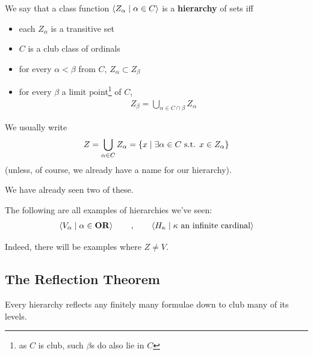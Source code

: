 \begin{boxdefinition}[Hierarchy] \label{Ch3:Def:Hierarchy}
    We say that a class function $\left\langle Z_{\alpha} \; \middle| \; \alpha \in C \right\rangle$ is a \textbf{hierarchy} of sets iff
    \begin{itemize}
        \item each $Z_{\alpha}$ is a transitive set
        \item $C$ is a club class of ordinals
        \item for every $\alpha < \beta$ from $C$, $Z_{\alpha} \subset Z_{\beta}$
        \item for every $\beta$ a limit point\footnote{as $C$ is club, such $\beta$s do also lie in $C$} of $C$,
        \begin{align*}
            Z_{\beta} = \bigcup_{\alpha \in C \cap \beta} Z_{\alpha}
        \end{align*}
    \end{itemize}
    We usually write
    \begin{align*}
        Z = \bigcup_{\alpha \in C} Z_{\alpha}
        = \left\{ x \; \middle\vert \; \exists \alpha \in C \text{ s.t. } x \in Z_{\alpha} \right\}
    \end{align*}
    (unless, of course, we already have a name for our hierarchy).
\end{boxdefinition}

We have already seen two of these.

\begin{boxexample}
    The following are all examples of hierarchies we've seen:
    \begin{align*}
        \left\langle V_{\alpha} \; \middle| \; \alpha \in \mathbf{OR} \right\rangle
        \qquad , \qquad
        \left\langle H_{\kappa} \; \middle| \; \kappa \text{ an infinite cardinal} \right\rangle
    \end{align*}
\end{boxexample}

Indeed, there will be examples where $Z \ne V$.

\subsection{The Reflection Theorem}

Every hierarchy reflects any finitely many formulae down to club many of its levels.

